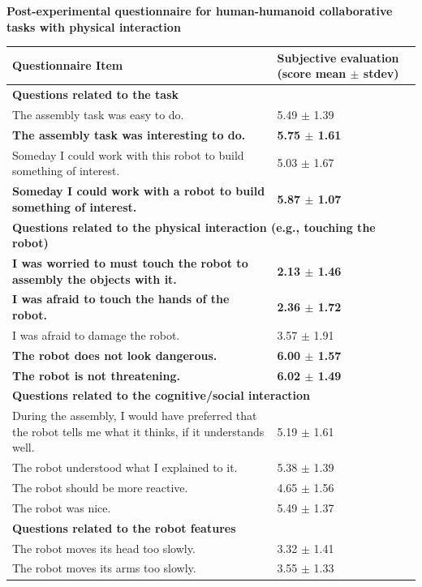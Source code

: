 \documentclass[twocolumn]{svjour3}          %
\begin{document}
\begin{table}
\textbf{Post-experimental questionnaire for human-humanoid collaborative tasks with physical interaction}

\begin{tabular}{|p{12cm}|p{3.5cm}|}
\hline
 Questionnaire Item & Subjective evaluation (score mean $\pm$ stdev) \\
 \hline
 \hline
\multicolumn{2}{|l|}{\textbf{Questions related to the task}} \\
\hline            
 The assembly task was easy to do. & 5.49 $\pm$ 1.39\\
 \textbf{The assembly task was interesting to do.}& \textbf{5.75 $\pm$ 1.61}\\
 Someday I could work with this robot to build something of interest.& 5.03 $\pm$ 1.67\\
\textbf{Someday I could work with a robot to build something of interest.}& \textbf{5.87 $\pm$ 1.07}\\
\hline
\multicolumn{2}{|l|}{\textbf{Questions related to the physical interaction (e.g., touching the robot)}} \\
\hline  
\textbf{I was worried to must touch the robot to assembly the objects with it.} & \textbf{2.13 $\pm$ 1.46}\\
\textbf{I was afraid to touch the hands of the robot.} & \textbf{2.36 $\pm$ 1.72} \\
 I was afraid to damage the robot. &	3.57 $\pm$ 1.91 \\
\textbf{The robot does not look dangerous.}& \textbf{6.00 $\pm$ 1.57}\\
\textbf{The robot is not threatening.}& \textbf{6.02 $\pm$ 1.49}\\
\hline
\multicolumn{2}{|l|}{\textbf{Questions related to the cognitive/social interaction}} \\
\hline 
 During the assembly, I would have preferred that the robot tells me what it thinks, if it understands well. & 5.19 $\pm$ 1.61 \\
 The robot understood what I explained to it.&	 5.38 $\pm$ 1.39\\
 The robot should be more reactive.& 4.65 $\pm$ 1.56\\
  The robot was nice. & 5.49 $\pm$ 1.37\\
\hline
\multicolumn{2}{|l|}{\textbf{Questions related to the robot features}} \\
\hline 
 The robot moves its head too slowly. & 3.32 $\pm$ 1.41\\
 The robot moves its arms too slowly. & 3.55 $\pm$ 1.33\\

\end{tabular}
\end{table}
\end{document}
